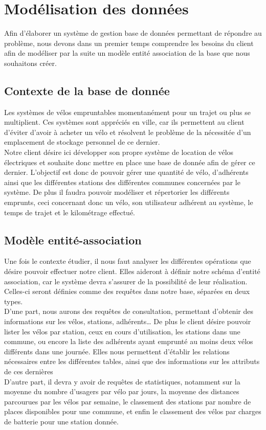 \documentclass[10pt]{article}
\begin{document}
  \section{Modélisation des données}\label{sec:modelisation}
  Afin d'élaborer un système de gestion base de données permettant de répondre au problème, nous devons dans un premier temps
  comprendre les besoins du client afin de modéliser par la suite un modèle entité association de la base que nous souhaitons créer.\\

  \subsection{Contexte de la base de donnée}\label{subsec:contexte}
  Les systèmes de vélos empruntables momentanément pour un trajet ou plus se multiplient.
  Ces systèmes sont appréciés en ville, car ils permettent au client d'éviter d'avoir à acheter un vélo et résolvent le problème
  de la nécessitée d'un emplacement de stockage personnel de ce dernier. \\
  Notre client désire ici développer son propre système de location de vélos électriques et souhaite donc mettre en place une base de
  donnée afin de gérer ce dernier.
  L'objectif est donc de pouvoir gérer une quantité de vélo, d'adhérents ainsi que les différentes stations des différentes communes
  concernées par le système.
  De plus il faudra pouvoir modéliser et répertorier les différents emprunts, ceci concernant donc un vélo, son utilisateur adhérent au système,
  le temps de trajet et le kilométrage effectué.\\

  \subsection{Modèle entité-association}\label{subsec:modele}
  Une fois le contexte étudier, il nous faut analyser les différentes opérations que désire pouvoir effectuer notre client.
  Elles aideront à définir notre schéma d'entité association, car le système devra s'assurer de la possibilité de leur réalisation.
  Celles-ci seront définies comme des requêtes dans notre base, séparées en deux types.\\
  D'une part, nous aurons des requêtes de consultation, permettant d'obtenir des informations sur les vélos, stations, adhérents\dots
  De plus le client désire pouvoir lister les vélos par station, ceux en cours d'utilisation, les stations dans une commune,
  ou encore la liste des adhérents ayant emprunté au moins deux vélos différents dans une journée.
  Elles nous permettent d'établir les relations nécessaires entre les différentes tables, ainsi que des informations sur les attributs de ces dernières\\
  D'autre part, il devra y avoir de requêtes de statistiques, notamment sur la moyenne du nombre d'usagers par vélo par jours,
  la moyenne des distances parcourues par les vélos par semaine, le classement des stations par nombre de places disponibles pour
  une commune, et enfin le classement des vélos par charges de batterie pour une station donnée.\\
\end{document}
